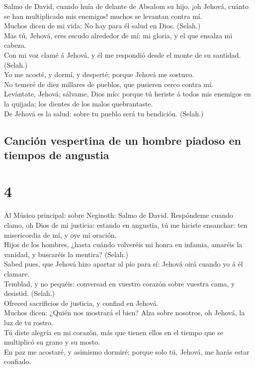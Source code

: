  Salmo de David, cuando huía de delante de Absalom su
hijo. ¡oh Jehová, cuánto se han multiplicado mis enemigos! muchos se
levantan contra mí.\\
 Muchos dicen de mi vida: No hay para él salud en Dios.
(Selah.)\\
 Mas tú, Jehová, eres escudo alrededor de mí: mi gloria, y
el que ensalza mi cabeza.\\
 Con mi voz clamé á Jehová, y él me respondió desde el
monte de su santidad. (Selah.)\\
 Yo me acosté, y dormí, y desperté; porque Jehová me
sostuvo.\\
 No temeré de diez millares de pueblos, que pusieren cerco
contra mí.\\
 Levántate, Jehová; sálvame, Dios mío: porque tú heriste á
todos mis enemigos en la quijada; los dientes de los malos
quebrantaste.\\
 De Jehová es la salud: sobre tu pueblo será tu bendición.
(Selah.)

\hypertarget{canciuxf3n-vespertina-de-un-hombre-piadoso-en-tiempos-de-angustia}{%
\subsection{Canción vespertina de un hombre piadoso en tiempos de
angustia}\label{canciuxf3n-vespertina-de-un-hombre-piadoso-en-tiempos-de-angustia}}

\hypertarget{section-19-4}{%
\section{4}\label{section-19-4}}

 Al Músico principal: sobre Neginoth: Salmo de David.
Respóndeme cuando clamo, oh Dios de mi justicia: estando en angustia, tú
me hiciste ensanchar: ten misericordia de mí, y oye mi oración.\\
 Hijos de los hombres, ¿hasta cuándo volveréis mi honra en
infamia, amaréis la vanidad, y buscaréis la mentira? (Selah.)\\
 Sabed pues, que Jehová hizo apartar al pío para sí:
Jehová oirá cuando yo á él clamare.\\
 Temblad, y no pequéis: conversad en vuestro corazón sobre
vuestra cama, y desistid. (Selah.)\\
 Ofreced sacrificios de justicia, y confiad en Jehová.\\
 Muchos dicen: ¿Quién nos mostrará el bien? Alza sobre
nosotros, oh Jehová, la luz de tu rostro.\\
 Tú diste alegría en mi corazón, más que tienen ellos en
el tiempo que se multiplicó su grano y su mosto.\\
 En paz me acostaré, y asimismo dormiré; porque solo tú,
Jehová, me harás estar confiado.

